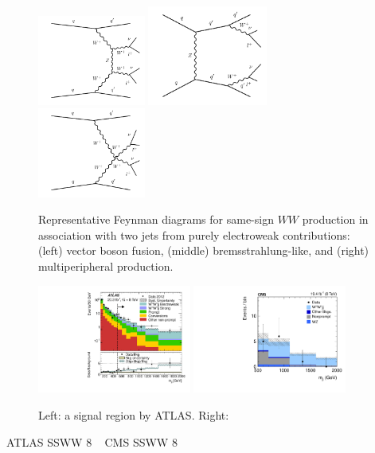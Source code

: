 \begin{figure}[htb] {
\centering
\includegraphics[width=0.315\textwidth]{figures/ss-exclboson-ww-diagram1.pdf}
\includegraphics[width=0.35\textwidth]{figures/ss-exclboson-ww-diagram2.pdf}
\includegraphics[width=0.315\textwidth]{figures/ss-exclboson-ww-diagram3.pdf}
\caption{
Representative Feynman diagrams for same-sign $WW$ production in association
with two jets from purely electroweak contributions:
(left) vector boson fusion,
(middle) bremsstrahlung-like,
and (right) multiperipheral production.
\label{fig:ss-exclboson-ww-sigdiagram}}

}
\end{figure}


\begin{figure}[p]
    \centering
    \includegraphics[width=0.45\textwidth]{figures/ss-exclboson-ww-ss-atlas8tev.pdf}
    \includegraphics[width=0.45\textwidth]{figures/ss-exclboson-ww-ss-cms8tev.pdf}
    \caption{
    Left:  a signal region by ATLAS.
    Right:  }
    \label{fig:ss-exclboson-ww-ss}
\end{figure}
ATLAS SSWW 8 \TeV~\cite{Aad:2014zda}
CMS SSWW 8 \TeV~\cite{Khachatryan:2014sta}
